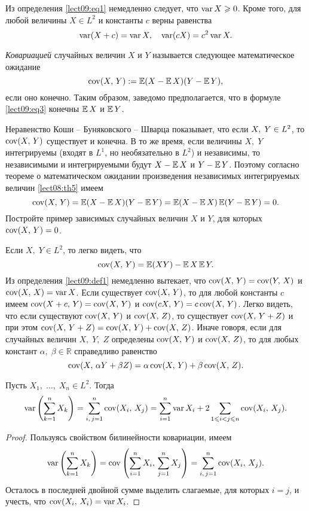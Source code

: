 Из определения \ref{lect09:eq1} немедленно следует, что $\operatorname*{var} X\geqslant 0$. Кроме того, для любой величины $X\in L^2$ и константы $c$ верны равенства
\[ \operatorname*{var}(X+c)=\operatorname*{var} X,\quad \operatorname*{var}(cX)=c^2\operatorname*{var} X. \]

\begin{definition}\label{lect09:def1}
\emph{Ковариацией} случайных величин $X$ и $Y$ называется следующее математическое ожидание
\begin{equation}\label{lect09:eq3}
\operatorname*{cov}(X,\,Y):=\operatorname*{\mathbb{E}}(X-\operatorname*{\mathbb{E}} X)(Y-\operatorname*{\mathbb{E}} Y),
\end{equation}
если оно конечно. Таким образом, заведомо предполагается, что в формуле \ref{lect09:eq3} конечны $\operatorname*{\mathbb{E}} X$ и $\operatorname*{\mathbb{E}} Y$. 
\end{definition}

Неравенство Коши -- Буняковского -- Шварца показывает, что если $X,\;Y\hm\in L^2$, то $\operatorname*{cov}(X,\,Y)$ существует и конечна. В то же время, если величины $X,\;Y$ интегрируемы (входят в $L^1$, но необязательно в $L^2$) и независимы, то независимыми и интегрируемыми будут $X-\operatorname*{\mathbb{E}} X$ и $Y-\operatorname*{\mathbb{E}} Y$. Поэтому согласно теореме о математическом ожидании произведения независимых интегрируемых величин \ref{lect08:th5} имеем
\[ \operatorname*{cov}(X,\,Y)=\operatorname*{\mathbb{E}}(X-\operatorname*{\mathbb{E}} X)(Y-\operatorname*{\mathbb{E}} Y)=\operatorname*{\mathbb{E}}(X-\operatorname*{\mathbb{E}} X)\operatorname*{\mathbb{E}}(Y-\operatorname*{\mathbb{E}} Y)=0. \]
Постройте пример зависимых случайных величин $X$ и $Y$, для которых $\operatorname*{cov}(X,\,Y)=0$.

Если $X,\;Y\in L^2$, то легко видеть, что 
\[ \operatorname*{cov}(X,\,Y)=\operatorname*{\mathbb{E}}(XY)-\operatorname*{\mathbb{E}} X\operatorname*{\mathbb{E}} Y. \]
Из определения \ref{lect09:def1} немедленно вытекает, что $\operatorname*{cov}(X,\,Y)=\operatorname*{cov}(Y,\,X)$ и $\operatorname*{cov}(X,\,X)=\operatorname*{var} X$. Если существует $\operatorname*{cov}(X,\,Y)$, то для любой константы $c$ имеем $\operatorname*{cov}(X+c,\,Y)=\operatorname*{cov}(X,\,Y)$ и $\operatorname*{cov}(cX,\,Y)=c\operatorname*{cov}(X,\,Y)$. Легко видеть, что если существуют $\operatorname*{cov}(X,\,Y)$ и $\operatorname*{cov}(X,\,Z)$, то существует $\operatorname*{cov}(X,\,Y+Z)$ и при этом $\operatorname*{cov}(X,\,Y+Z)=\operatorname*{cov}(X,\,Y)+\operatorname*{cov}(X,\,Z)$. Иначе говоря, если для случайных величин $X,\;Y,\;Z$ определены $\operatorname*{cov}(X,\,Y)$ и $\operatorname*{cov}(X,\,Z)$, то для любых констант $\alpha,\;\beta\in\mathbb{R}$ справедливо равенство
\[ \operatorname*{cov}(X,\,\alpha Y+\beta Z)=\alpha\operatorname*{cov}(X,\,Y)+\beta\operatorname*{cov}(X,\,Z). \]

\begin{lemma}\label{lect09:lemma1}
Пусть $X_1,\;\ldots,\;X_n\in L^2$. Тогда
\begin{equation}\label{lect09:eq4}
\operatorname*{var}\left(\sum_{k=1}^nX_k\right)=\sum_{i,\,j=1}^n\operatorname*{cov}(X_i,\,X_j)=\sum_{i=1}^n\operatorname*{var} X_i+2\sum_{1\leqslant i<j\leqslant n}\operatorname*{cov}(X_i,\,X_j).
\end{equation}
\end{lemma}
\begin{proof}
Пользуясь свойством билинейности ковариации, имеем
\[ \operatorname*{var}\left(\sum_{k=1}^nX_k\right)=\operatorname*{cov}\left(\sum_{i=1}^nX_i,\,\sum_{j=1}^nX_j\right)=\sum_{i,\,j=1}^n\operatorname*{cov}(X_i,\,X_j). \]
Осталось в последней двойной сумме выделить слагаемые, для которых $i=j$, и учесть, что $\operatorname*{cov}(X_i,\,X_i)=\operatorname*{var} X_i$.
\end{proof}

